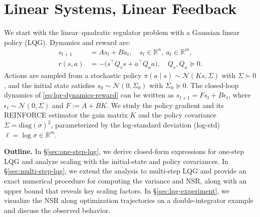 \section{Linear Systems, Linear Feedback}
\label{sec:lqg}

We start with the linear–quadratic regulator problem with a Gaussian linear policy (LQG). Dynamics and reward are:
\begin{subequations}\label{eq:lqr-dynamics-reward}
\begin{align}
  s_{t+1} &= A s_t + B a_t,\quad s_t\in\mathbb{R}^n,\ a_t\in\mathbb{R}^m, \\
  r(s,a) &= -\big(s^\top Q_s s + a^\top Q_a a\big),\quad Q_s, Q_a \succeq 0.
\end{align}
\end{subequations}
Actions are sampled from a stochastic policy $\pi(a\mid s) \sim \mathcal{N}(K s, \Sigma)$ with $\Sigma \succ 0$, and the initial state satisfies $s_0\sim\mathcal N(0,\Sigma_0)$ with $\Sigma_0 \succeq 0$. The closed-loop dynamics of \eqref{eq:lqr-dynamics-reward} can be written as $s_{t+1} = F s_t + B \epsilon_t$, where $\epsilon_t \sim \mathcal{N}(0, \Sigma)$ and $F := A + BK$. We study the policy gradient and its REINFORCE estimator \wrt the gain matrix $K$ and the policy covariance $\Sigma=\text{diag}(\sigma)^2$, parameterized by the log-standard deviation (log-std) \(\ell=\log\sigma\in\mathbb R^m\).

\textbf{Outline.} In \S\ref{sec:one-step-lqg}, we derive closed-form expressions for one-step LQG and analyze scaling with the initial-state and policy covariances. In \S\ref{sec:multi-step-lqg}, we extend the analysis to multi-step LQG and provide an exact numerical procedure for computing the variance and NSR, along with an upper bound that reveals key scaling factors. In \S\ref{sec:lqg-experiment}, we visualize the NSR along optimization trajectories on a double-integrator example and discuss the observed behavior.


